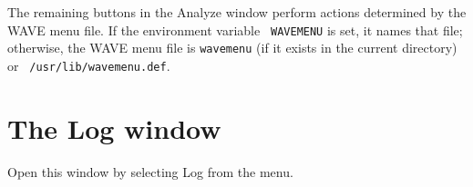 \documentclass[twoside]{book}
\newcommand{\button}[1]{\cornersize{2}\ovalbox{\rule[-.3mm]{0cm}{2.5mm}\small\sf ~#1~}}
\newcommand{\menubutton}[1]{\button{#1~\ensuremath{\nabla}}}
\newcommand{\WAVE}{{\sf WAVE}\xspace}
\begin{document}
The remaining buttons in the {\sf Analyze} window perform actions
determined by the \WAVE{} menu file. If the environment variable {\tt
WAVEMENU} is set, it names that file; otherwise, the \WAVE{} menu file
is {\tt wavemenu} (if it exists in the current directory) or {\tt
/usr/lib/wavemenu.def}.

\section{The {\sf Log} window}

\begin{figure}[h]
\centerline{}
\end{figure}
\label{sec:log-window}
Open this window by selecting {\sf Log} from the \menubutton{File} menu.
\end{document}
